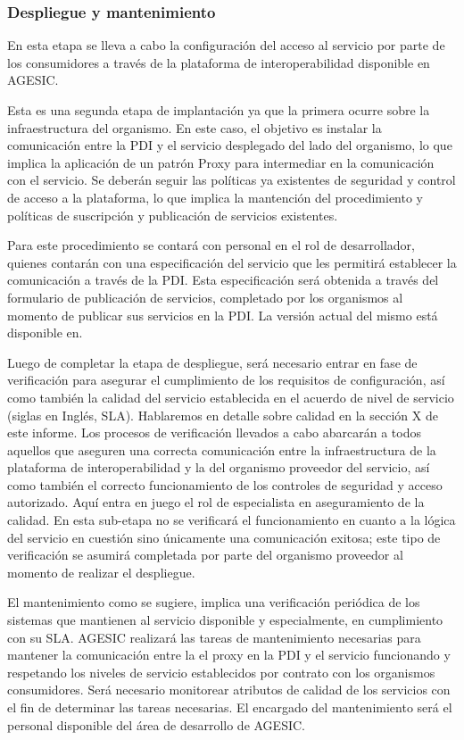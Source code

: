\documentclass[11pt]{article}
\begin{document}
			\subsubsection{Despliegue y mantenimiento}
				En esta etapa se lleva a cabo la configuración del acceso al servicio por parte de los consumidores a través de la plataforma de interoperabilidad disponible en AGESIC.

				Esta es una segunda etapa de implantación ya que la primera ocurre sobre la infraestructura del organismo. En este caso, el objetivo es instalar la comunicación entre la PDI y el servicio desplegado del lado del organismo, lo que implica la aplicación de un patrón Proxy para intermediar en la comunicación con el servicio. Se deberán seguir las políticas ya existentes de seguridad y control de acceso a la plataforma, lo que implica la mantención del procedimiento y políticas de suscripción y publicación de servicios existentes.

				Para este procedimiento se contará con personal en el rol de desarrollador, quienes contarán con una especificación del servicio que les permitirá establecer la comunicación a través de la PDI. Esta especificación será obtenida a través del formulario de publicación de servicios, completado por los organismos al momento de publicar sus servicios en la PDI. La versión actual del mismo está disponible en.

				Luego de completar la etapa de despliegue, será necesario entrar en fase de verificación para asegurar el cumplimiento de los requisitos de configuración, así como también la calidad del servicio establecida en el acuerdo de nivel de servicio (siglas en Inglés, SLA). Hablaremos en detalle sobre calidad en la sección X de este informe. Los procesos de verificación llevados a cabo abarcarán a todos aquellos que aseguren una correcta comunicación entre la infraestructura de la plataforma de interoperabilidad y la del organismo proveedor del servicio, así como también el correcto funcionamiento de los controles de seguridad y acceso autorizado. Aquí entra en juego el rol de especialista en aseguramiento de la calidad. En esta sub-etapa no se verificará el funcionamiento en cuanto a la lógica del servicio en cuestión sino únicamente una comunicación exitosa; este tipo de verificación se asumirá completada por parte del organismo proveedor al momento de realizar el despliegue.

				El mantenimiento como se sugiere, implica una verificación periódica de los sistemas que mantienen al servicio disponible y especialmente, en cumplimiento con su SLA. AGESIC realizará las tareas de mantenimiento necesarias para mantener la comunicación entre la el proxy en la PDI y el servicio funcionando y respetando los niveles de servicio establecidos por contrato con los organismos consumidores. Será necesario monitorear atributos de calidad de los servicios con el fin de determinar las tareas necesarias. El encargado del mantenimiento será el personal disponible del área de desarrollo de AGESIC.
\end{document}
